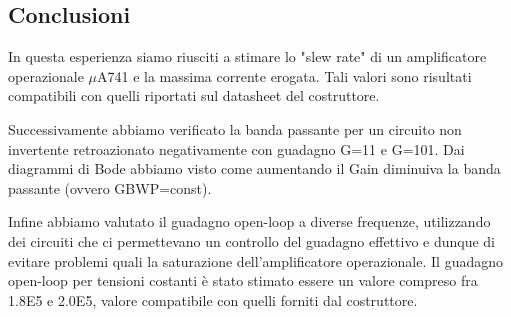 \subsection*{Conclusioni}

In questa esperienza siamo riusciti a stimare lo "slew rate" di un amplificatore operazionale $\mu$A741 e la massima corrente erogata. Tali valori sono risultati compatibili con quelli riportati sul datasheet del costruttore. 

Successivamente abbiamo verificato la banda passante per un circuito non invertente retroazionato negativamente con guadagno G=11 e G=101. Dai diagrammi di Bode abbiamo visto come aumentando il Gain diminuiva la banda passante (ovvero GBWP=const).

Infine abbiamo valutato il guadagno open-loop a diverse frequenze, utilizzando dei circuiti che ci permettevano un controllo del guadagno effettivo e dunque di evitare problemi quali la saturazione dell'amplificatore operazionale. Il guadagno open-loop per tensioni costanti è stato stimato essere un valore compreso fra \num{1.8E5} e \num{2.0E5}, valore compatibile con quelli forniti dal costruttore.